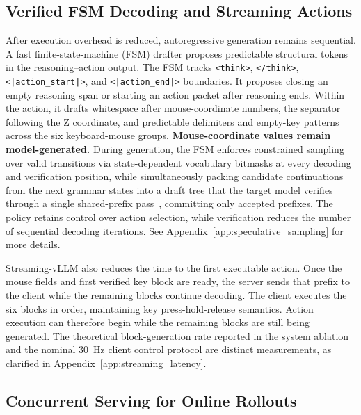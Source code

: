 \subsection{Verified FSM Decoding and Streaming Actions}
\label{sec:streaming_action}

After execution overhead is reduced, autoregressive generation remains sequential. A fast finite-state-machine (FSM) drafter proposes predictable structural tokens in the reasoning–action output. The FSM tracks \texttt{<think>}, \texttt{</think>}, \texttt{<|action\_start|>}, and \texttt{<|action\_end|>} boundaries. It proposes closing an empty reasoning span or starting an action packet after reasoning ends. Within the action, it drafts whitespace after mouse-coordinate numbers, the separator following the Z coordinate, and predictable delimiters and empty-key patterns across the six keyboard-mouse groups. \textbf{Mouse-coordinate values remain model-generated.} During generation, the FSM enforces constrained sampling over valid transitions via state-dependent vocabulary bitmasks at every decoding and verification position, while simultaneously packing candidate continuations from the next grammar states into a draft tree that the target model verifies through a single shared-prefix pass~\cite{leviathan2023fast,zheng2024sglang,miao2024specinfer,cai2024medusa,li2024eagle}, committing only accepted prefixes. The policy retains control over action selection, while verification reduces the number of sequential decoding iterations. See Appendix~\ref{app:speculative_sampling} for more details.

Streaming-vLLM also reduces the time to the first executable action. Once the mouse fields and first verified key block are ready, the server sends that prefix to the client while the remaining blocks continue decoding. The client executes the six blocks in order, maintaining key press-hold-release semantics. Action execution can therefore begin while the remaining blocks are still being generated. The theoretical block-generation rate reported in the system ablation and the nominal 30~Hz client control protocol are distinct measurements, as clarified in Appendix~\ref{app:streaming_latency}.

\subsection{Concurrent Serving for Online Rollouts}
\label{sec:streaming_serving}

